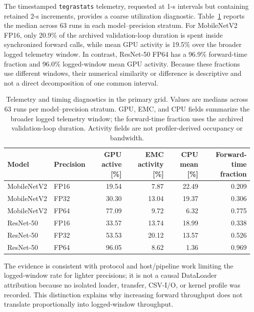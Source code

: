 \documentclass[electronics,article,submit,pdftex,moreauthors]{Definitions/mdpi}
\newcommand{\mobile}{MobileNetV2}
\newcommand{\resnet}{ResNet-50}
\renewcommand{\tabref}[1]{Table~\ref{#1}}
\begin{document}
The timestamped \texttt{tegrastats} telemetry, requested at 1-s intervals but containing retained 2-s increments, provides a coarse utilization diagnostic. \tabref{tab:utilization} reports the median across 63 runs in each model--precision stratum. For \mobile{} FP16, only 20.9\% of the archived validation-loop duration is spent inside synchronized forward calls, while mean GPU activity is 19.5\% over the broader logged telemetry window. In contrast, \resnet{} FP64 has a 96.9\% forward-time fraction and 96.0\% logged-window mean GPU activity. Because these fractions use different windows, their numerical similarity or difference is descriptive and not a direct decomposition of one common interval.

\begin{table}[t]
\caption{Telemetry and timing diagnostics in the primary grid. Values are medians across 63 runs per model--precision stratum. GPU, EMC, and CPU fields summarize the broader logged telemetry window; the forward-time fraction uses the archived validation-loop duration. Activity fields are not profiler-derived occupancy or bandwidth.}
\label{tab:utilization}
\centering
\small
\begin{tabular}{llrrrr}
\toprule
Model & Precision & \shortstack{GPU\\active [\%]} & \shortstack{EMC\\activity [\%]} & \shortstack{CPU\\mean [\%]} & \shortstack{Forward-time\\fraction} \\
\midrule
\mobile{} & FP16 & 19.54 & 7.87 & 22.49 & 0.209 \\
\mobile{} & FP32 & 30.30 & 13.04 & 19.37 & 0.306 \\
\mobile{} & FP64 & 77.09 & 9.72 & 6.32 & 0.775 \\
\resnet{} & FP16 & 33.57 & 13.74 & 18.99 & 0.338 \\
\resnet{} & FP32 & 53.53 & 20.12 & 13.57 & 0.526 \\
\resnet{} & FP64 & 96.05 & 8.62 & 1.36 & 0.969 \\
\bottomrule
\end{tabular}
\end{table}

The evidence is consistent with protocol and host/pipeline work limiting the logged-window rate for lighter precisions; it is not a causal DataLoader attribution because no isolated loader, transfer, CSV-I/O, or kernel profile was recorded. This distinction explains why increasing forward throughput does not translate proportionally into logged-window throughput.
\end{document}
